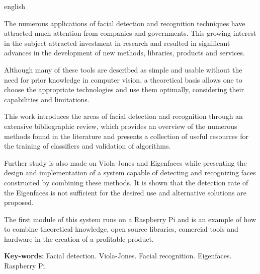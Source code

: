 \begin{resumo}[Abstract]
 \begin{otherlanguage*}{english}

The numerous applications of facial detection and recognition techniques have attracted much attention from companies and governments. This growing interest in the subject attracted investment in research and resulted in significant advances in the development of new methods, libraries, products and services.

Although many of these tools are described as simple and usable without the need for prior knowledge in computer vision, a theoretical basis allows one to choose the appropriate technologies and use them optimally, considering their capabilities and limitations.

This work introduces the areas of facial detection and recognition through an extensive bibliographic review, which provides an overview of the numerous methods found in the literature and presents a collection of useful resources for the training of classifiers and validation of algorithms.

Further study is also made on Viola-Jones and Eigenfaces while presenting the design and implementation of a system capable of detecting and recognizing faces constructed by combining these methods. It is shown that the detection rate of the Eigenfaces is not sufficient for the desired use and alternative solutions are proposed.

The first module of this system runs on a Raspberry Pi and is an example of how to combine theoretical knowledge, open source libraries, comercial tools and hardware in the creation of a profitable product.
   \vspace{\onelineskip}
 
   \noindent 
   \textbf{Key-words}: Facial detection. Viola-Jones. Facial recognition. Eigenfaces. Raspberry Pi.
 \end{otherlanguage*}
\end{resumo}

 

  

